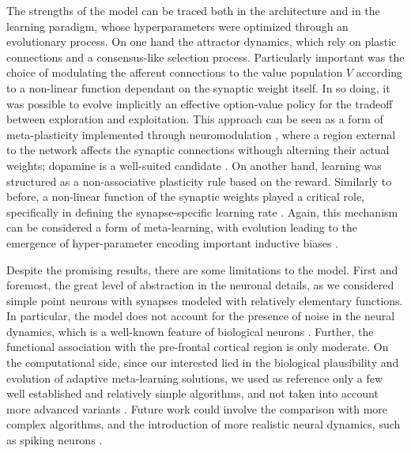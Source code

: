 The strengths of the model can be traced both in the architecture and in the learning paradigm, whose hyperparameters were optimized through an evolutionary process.
On one hand the attractor dynamics, which rely on plastic connections and a consensus-like selection process.
Particularly important was the choice of modulating the afferent connections to the value population $V$ according to a non-linear function dependant on the synaptic weight itself. In so doing, it was possible to evolve implicitly an effective option-value policy for the tradeoff between exploration and exploitation.
This approach can be seen as a form of meta-plasticity implemented through neuromodulation \cite{wangMetalearningNaturalArtificial2021}, where a region external to the network affects the synaptic connections withough alterning their actual weights; dopamine is a well-suited candidate \cite{toblerAdaptiveCodingReward2005, roeschDopamineNeuronsEncode2007, coolsChemistryAdaptiveMind2019}.
On another hand, learning was structured as a non-associative plasticity rule based on the reward. Similarly to before, a non-linear function of the synaptic weights played a critical role, specifically in defining the synapse-specific learning rate \cite{larsenSynapsetypespecificPlasticityLocal2015}.
Again, this mechanism can be considered a form of meta-learning, with evolution leading to the emergence of hyper-parameter encoding important inductive biases \cite{inglisModulationDopamineAdaptive2021, iigayaAdaptiveLearningDecisionmaking2016}.

Despite the promising results, there are some limitations to the model. First and foremost, the great level of abstraction in the neuronal details, as we considered simple point neurons with synapses modeled with relatively elementary functions.
In particular, the model does not account for the presence of noise in the neural dynamics, which is a well-known feature of biological neurons \cite{faisalNoiseNeuronsOther2012}.
Further, the functional association with the pre-frontal cortical region is only moderate.
On the computational side, since our interested lied in the biological plausibility and evolution of adaptive meta-learning solutions, we used as reference only a few well established and relatively simple algorithms, and not taken into account more advanced variants \cite{tokicAdaptiveEGreedyExploration2010, tokicValueDifferenceBasedExploration2011}.
Future work could involve the comparison with more complex algorithms, and the introduction of more realistic neural dynamics, such as spiking neurons \cite{nunesSpikingNeuralNetworks2022}.

